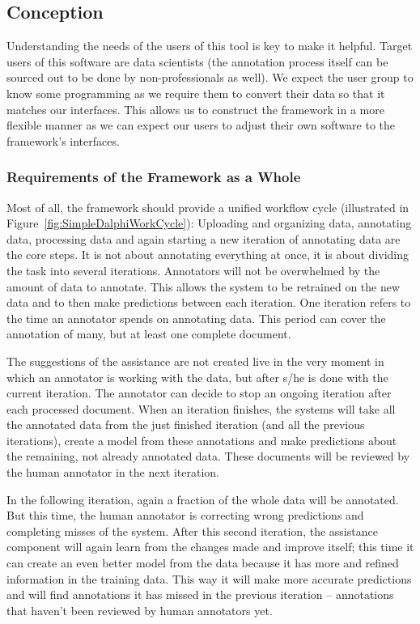 \subsection{Conception}
	Understanding the needs of the users of this tool is key to make it helpful. Target users of this software are data scientists (the annotation process itself can be sourced out to be done by non-professionals as well). We expect the user group to know some programming as we require them to convert their data so that it matches our interfaces. This allows us to construct the framework in a more flexible manner as we can expect our users to adjust their own software to the framework's interfaces.

	\subsubsection{Requirements of the Framework as a Whole}


		Most of all, the framework should provide a unified workflow cycle (illustrated in Figure~\ref{fig:SimpleDalphiWorkCycle}): Uploading and organizing data, annotating data, processing data and again starting a new iteration of annotating data are the core steps. It is not about annotating everything at once, it is about dividing the task into several iterations. Annotators will not be overwhelmed by the amount of data to annotate. This allows the system to be retrained on the new data and to then make predictions between each iteration. One iteration refers to the time an annotator spends on annotating data. This period can cover the annotation of many, but at least one complete document.

		The suggestions of the assistance are not created live in the very moment in which an annotator is working with the data, but after s/he is done with the current iteration. The annotator can decide to stop an ongoing iteration after each processed document. When an iteration finishes, the systems will take all the annotated data from the just finished iteration (and all the previous iterations), create a model from these annotations and make predictions about the remaining, not already annotated data. These documents will be reviewed by the human annotator in the next iteration.

		In the following iteration, again a fraction of the whole data will be annotated. But this time, the human annotator is correcting wrong predictions and completing misses of the system. After this second iteration, the assistance component will again learn from the changes made and improve itself; this time it can create an even better model from the data because it has more and refined information in the training data. This way it will make more accurate predictions and will find annotations it has missed in the previous iteration -- annotations that haven't been reviewed by human annotators yet.

